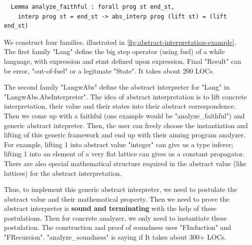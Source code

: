 \begin{verbatim}
  Lemma analyze_faithful : forall prog st end_st, 
    interp prog st = end_st -> abs_interp prog (lift st) = (lift end_st)
\end{verbatim}
  

We construct four families, illustrated in \cref{fig:abstract-interpretation-example}.
The first family "Lang" define the big step operator (using fuel) of a
while language, with expression and stmt defined upon expression. Final "Result" can be error, "out-of-fuel" or a legitmate "State". It takes about 200 LOCs. 

The second family "LangwAbs" define the abstract interpreter for "Lang" in "LangwAbs.AbsInterpreter".
The idea of abstract interpretation is to lift concrete interpretation, their value and their states into their abstract correspondence. Then we come up with a faithful (one example would be "analyze_faithful") and generic abstract intepreter. Then, the user can freely choose the instantiation and lifting of this generic framework and end up with their aiming program analyzer. For example, lifting 1 into abstract value "integer" can give us a type inferer; lifting 1 into an element of a very flat lattice can gives us a constant propagator. There are also special mathematical structure required in the abstract value (like lattices) for the abstract interpretation. 

Thus, to implement this generic abstract interpreter, we need to postulate the abstract value and their mathematical property. Then we need to prove the abstract interpreter is \textbf{sound and terminating}  with the help of these postulations. Then for concrete analyzer, we only need to instantiate these postulation. The construction and proof of soundness uses "FInduction" and "FRecursion". "analyze_soundness" is saying if 
It takes about 300+ LOCs. 


